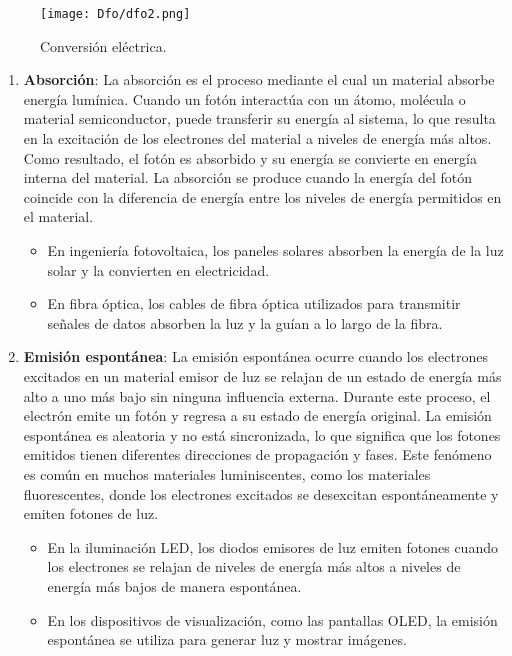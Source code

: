 \documentclass[
	12pt, %
	fleqn, %
	a4paper, %
	oneside, %
]{LegrandOrangeBook}
\begin{document}
\begin{figure}[H]
\centering
\texttt{[image: Dfo/dfo2.png]}
\caption{Conversión eléctrica.}
\end{figure}
\begin{enumerate}
\item \textbf{Absorción}: La absorción es el proceso mediante el cual un material absorbe energía lumínica. Cuando un fotón interactúa con un átomo, molécula o material semiconductor, puede transferir su energía al sistema, lo que resulta en la excitación de los electrones del material a niveles de energía más altos. Como resultado, el fotón es absorbido y su energía se convierte en energía interna del material. La absorción se produce cuando la energía del fotón coincide con la diferencia de energía entre los niveles de energía permitidos en el material.
\begin{itemize}
\item En ingeniería fotovoltaica, los paneles solares absorben la energía de la luz solar y la convierten en electricidad.
\item En fibra óptica, los cables de fibra óptica utilizados para transmitir señales de datos absorben la luz y la guían a lo largo de la fibra.
\end{itemize}
\item \textbf{Emisión espontánea}: La emisión espontánea ocurre cuando los electrones excitados en un material emisor de luz se relajan de un estado de energía más alto a uno más bajo sin ninguna influencia externa. Durante este proceso, el electrón emite un fotón y regresa a su estado de energía original. La emisión espontánea es aleatoria y no está sincronizada, lo que significa que los fotones emitidos tienen diferentes direcciones de propagación y fases. Este fenómeno es común en muchos materiales luminiscentes, como los materiales fluorescentes, donde los electrones excitados se desexcitan espontáneamente y emiten fotones de luz.
\begin{itemize}
\item En la iluminación LED, los diodos emisores de luz emiten fotones cuando los electrones se relajan de niveles de energía más altos a niveles de energía más bajos de manera espontánea.
\item En los dispositivos de visualización, como las pantallas OLED, la emisión espontánea se utiliza para generar luz y mostrar imágenes.
\end{itemize}

\end{enumerate}
\end{document}
